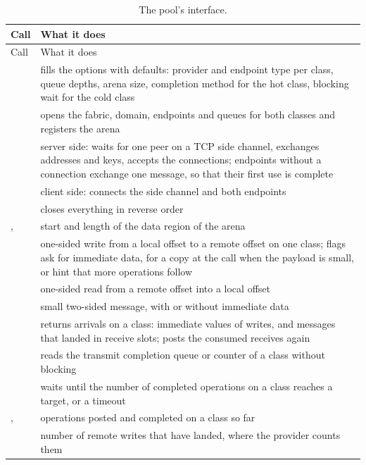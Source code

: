 \begin{tightblock}
\begin{longtable}{L{4.1cm}L{10.3cm}}
  \caption[The pool's interface]{The pool's interface.}\label{tab:sfapi}\\
  \toprule
  Call & What it does \\
  \midrule
  \endfirsthead
  \toprule
  Call & What it does \\
  \midrule
  \endhead
   & fills the options with defaults: provider and endpoint type per class, queue depths, arena size, completion method for the hot class, blocking wait for the cold class \\
   & opens the fabric, domain, endpoints and queues for both classes and registers the arena \\
   & server side: waits for one peer on a TCP side channel, exchanges addresses and keys, accepts the connections; endpoints without a connection exchange one message, so that their first use is complete \\
   & client side: connects the side channel and both endpoints \\
   & closes everything in reverse order \\
  ,  & start and length of the data region of the arena \\
   & one-sided write from a local offset to a remote offset on one class; flags ask for immediate data, for a copy at the call when the payload is small, or hint that more operations follow \\
   & one-sided read from a remote offset into a local offset \\
   & small two-sided message, with or without immediate data \\
   & returns arrivals on a class: immediate values of writes, and messages that landed in receive slots; posts the consumed receives again \\
   & reads the transmit completion queue or counter of a class without blocking \\
   & waits until the number of completed operations on a class reaches a target, or a timeout \\
  ,  & operations posted and completed on a class so far \\
   & number of remote writes that have landed, where the provider counts them \\

\end{longtable}
\end{tightblock}
